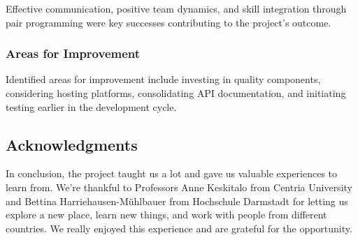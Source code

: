 Effective communication, positive team dynamics, and skill integration through pair programming were key successes contributing to the project's outcome.

\subsubsection{Areas for Improvement}

Identified areas for improvement include investing in quality components, considering hosting platforms, consolidating API documentation, and initiating testing earlier in the development cycle.

\subsection{Acknowledgments}
In conclusion, the project taught us a lot and gave us valuable experiences to learn from. We're thankful to Professors Anne Keskitalo from Centria University and Bettina Harriehausen-Mühlbauer from Hochschule Darmstadt for letting us explore a new place, learn new things, and work with people from different countries. We really enjoyed this experience and are grateful for the opportunity.
